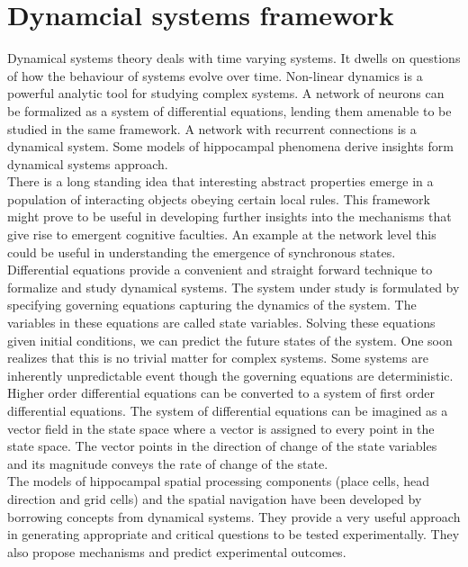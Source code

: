 
\section{Dynamcial systems framework}
\label{dynamics}



Dynamical systems theory deals with time varying systems. It dwells on questions of how the behaviour of systems evolve over time. Non-linear dynamics is a powerful analytic tool for studying complex systems. A network of neurons can be formalized as a system of differential equations, lending them amenable to be studied in the same framework. A network with recurrent connections is a dynamical system. Some models of hippocampal phenomena derive insights form dynamical systems approach. \\
There is a long standing idea that interesting abstract properties emerge in a population of interacting objects obeying certain local rules. This framework might prove to be useful in developing further insights into the mechanisms that give rise to emergent cognitive faculties. An example at the network level this could be useful in understanding the emergence of synchronous states.\\
Differential equations provide a convenient and straight forward technique to formalize and study dynamical systems. The system under study is formulated by specifying governing equations capturing the dynamics of the system. The variables in these equations are called state variables. Solving these equations given initial conditions, we can predict the future states of the system. One soon realizes that this is no trivial matter for complex systems. Some systems are inherently unpredictable event though the governing equations are deterministic. Higher order differential equations can be converted to a system of first order differential equations. The system of differential equations can be imagined as a vector field in the state space where a vector is assigned to every point in the state space. The vector points in the direction of change of the state variables and its magnitude conveys the rate of change of the state. \\

The models of hippocampal spatial processing components (place cells, head direction and grid cells) and the spatial navigation have been developed by borrowing concepts from dynamical systems. They provide a very useful approach in generating appropriate and critical questions to be tested experimentally. They also propose mechanisms and predict experimental outcomes. 
 
